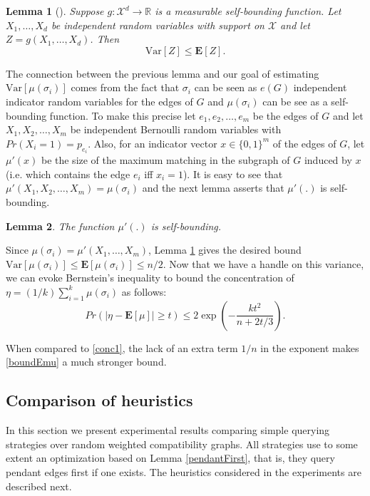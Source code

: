 \documentclass[12pt]{article}
\newtheorem{lemma}{Lemma}
\newcommand{\E}[1]{\mathbf{E}\left[#1\right]}
\newcommand{\V}[1]{\textrm{Var}[#1]}
\begin{document}
		\begin{lemma}[\cite{BoucheronLB03}] \label{selfBoundingVar}
			Suppose $g: \mathcal{X}^d \rightarrow \mathbb{R}$ is a measurable self-bounding function. Let $X_1, \ldots, X_d$ be independent random variables with support on $\mathcal{X}$ and let $Z = g(X_1, \ldots, X_d)$. Then $$\V {Z} \le \E{Z}.$$
		\end{lemma}

		The connection between the previous lemma and our goal of estimating $\V{\mu(\sigma_i)}$ comes from the fact that $\sigma_i$ can be seen as $e(G)$ independent indicator random variables for the edges of $G$ and $\mu(\sigma_i)$ can be see as a self-bounding function. To make this precise let $e_1, e_2, \ldots, e_m$ be the edges of $G$ and let $X_1, X_2, \ldots, X_m$ be independent Bernoulli random variables with $Pr(X_i = 1) = p_{e_i}$. Also, for an indicator vector $x \in \{0,1\}^m$ of the edges of $G$, let $\mu'(x)$ be the size of the maximum matching in the subgraph of $G$ induced by $x$ (i.e. which contains the edge $e_i$ iff $x_i = 1$). It is easy to see that $\mu'(X_1, X_2, \ldots, X_m) = \mu(\sigma_i)$ and the next lemma asserts that $\mu'(.)$ is self-bounding.
		
		\begin{lemma} \label{selfBounding}
			The function $\mu'(.)$ is self-bounding.
		\end{lemma}
		
		Since $\mu(\sigma_i) = \mu'(X_1, \ldots, X_m)$, Lemma \ref{selfBoundingVar} gives the desired bound $\V{\mu(\sigma_i)} \le \E{\mu(\sigma_i)} \le n/2$. Now that we have a handle on this variance, we can evoke Bernstein's inequality \cite{BoucheronLB03} to bound the concentration of $\eta = (1/k) \sum_{i = 1}^k \mu(\sigma_i)$ as follows:
\begin{equation} 
		Pr\left(\left|\eta - \E{\mu}\right| \ge t\right) \le 2 \exp\left( -\frac{k t^2}{n + 2t/3} \right). \label{boundEmu}
	\end{equation}
	
	When compared to \eqref{conc1}, the lack of an extra term $1/n$ in the exponent makes \eqref{boundEmu} a much stronger bound.
						 		

	\subsection{Comparison of heuristics} \label{exp}
		
		In this section we present experimental results comparing simple querying strategies over random weighted compatibility graphs. All strategies use to some extent an optimization based on Lemma \ref{pendantFirst}, that is, they query pendant edges first if one exists. The heuristics considered in the experiments are described next.
		
\end{document}
